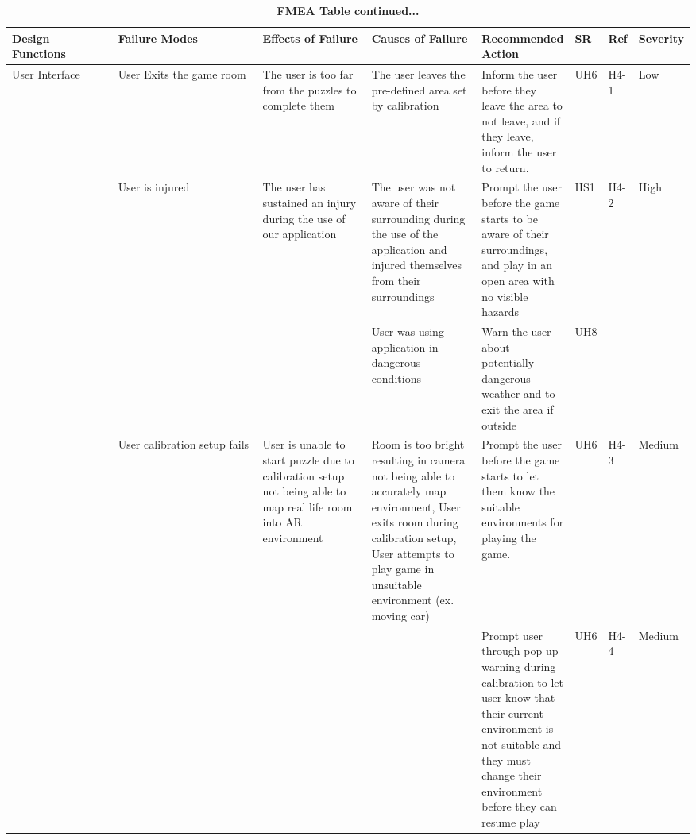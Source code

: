 \documentclass{article}
\begin{document}
\begin{table}[H]
    \begin{adjustbox}{width=(/5)}
    \centering
    

    \begin{tabular}{|p{0.20\linewidth} | p{0.30\linewidth} | p{0.20\linewidth}|  p{0.20\linewidth}|  p{0.30\linewidth}|  p{0.07\linewidth}|  p{0.07\linewidth}|p{0.12\linewidth}| }
    \hline
         \textbf{Design Functions} & \textbf{Failure Modes} & \textbf{Effects of Failure} & \textbf{Causes of Failure} & \textbf{Recommended Action} & \textbf{SR} & \textbf{Ref} & \textbf{Severity}\\
         \hline
          User Interface                   &           User Exits the game room             &           The user is too far from the puzzles to complete them           &                The user leaves the pre-defined area set by calibration            &           Inform the user before they leave the area to not leave, and if they leave, inform the user to return.                  &   UH6          &   H4-1           &   Low               \\
            &    User is injured     &    The user has sustained an injury during the use of our application      &  The user was not aware of their surrounding during the use of the application and injured themselves from their surroundings \newline                 &    Prompt the user before the game starts to be aware of their surroundings, and play in an open area with no visible hazards    &  HS1           &   H4-2     & High\\&&& User was using application in dangerous conditions \newline & Warn the user about potentially dangerous weather and to exit the area if outside&   UH8   &  &                \\
                                   &    User calibration setup fails   &   User is unable to start puzzle due to calibration setup not being able to map real life room into AR environment & Room is too bright resulting in camera not being able to accurately map environment, User exits room during calibration setup, User attempts to play game in unsuitable environment (ex. moving car) & Prompt the user before the game starts to let them know the suitable environments for playing the game. &UH6&H4-3& Medium\\&&&& Prompt user through pop up warning during calibration to let user know that their current environment is not suitable and they must change their environment before they can resume play   & UH6   & H4-4 & Medium   \\
          \hline
    \end{tabular}
    \end{adjustbox}
    \caption{\bf FMEA Table continued...}
    \label{tab:FMEA2}
\end{table}
\end{document}
